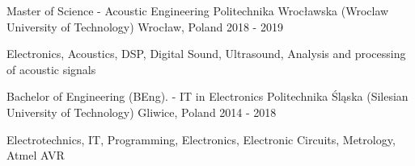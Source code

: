 

\begin{cventries}

  \cventry
    {Master of Science - Acoustic Engineering} %
    {Politechnika Wrocławska (Wroclaw University of Technology)} %
    {Wrocław, Poland} %
    {2018 - 2019} %
    {
      \begin{cvitems} %
        \item {Electronics, Acoustics, DSP, Digital Sound, Ultrasound, Analysis and processing of acoustic signals}
      \end{cvitems}
    }

  \cventry
    {Bachelor of Engineering (BEng). - IT in Electronics} %
    {Politechnika Śląska (Silesian University of Technology)} %
    {Gliwice, Poland} %
    {2014 - 2018} %
    {
      \begin{cvitems} %
        \item {Electrotechnics, IT, Programming, Electronics, Electronic Circuits, Metrology, Atmel AVR}
      \end{cvitems}
    }

\end{cventries}

